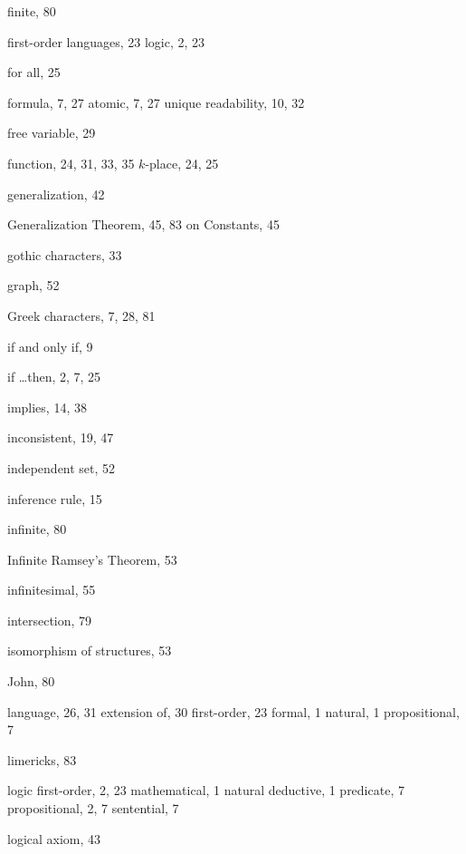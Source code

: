 \documentclass[12pt]{amsbook}
\theoremstyle{plain}
\theoremstyle{definition}
\theoremstyle{remark}
\begin{document}
\begin{theindex}
  \indexspace

  \item finite, 80
  \item first-order 
    \subitem languages, 23
    \subitem logic, 2, 23
  \item for all, 25
  \item formula, 7, 27
    \subitem atomic, 7, 27
    \subitem unique readability, 10, 32
  \item free variable, 29
  \item function, 24, 31, 33, 35
    \subitem $k$-place, 24, 25

  \indexspace

  \item generalization, 42
  \item Generalization Theorem, 45, 83
    \subitem on Constants, 45
  \item gothic characters, 33
  \item graph, 52
  \item Greek characters, 7, 28, 81

  \indexspace

  \item if and only if, 9
  \item if \dots then, 2, 7, 25
  \item implies, 14, 38
  \item inconsistent, 19, 47
  \item independent set, 52
  \item inference rule, 15
  \item infinite, 80
  \item Infinite Ramsey's Theorem, 53
  \item infinitesimal, 55
  \item intersection, 79
  \item isomorphism of structures, 53

  \indexspace

  \item John, 80

  \indexspace

  \item language, 26, 31
    \subitem extension of, 30
    \subitem first-order, 23
    \subitem formal, 1
    \subitem natural, 1
    \subitem propositional, 7
  \item limericks, 83
  \item logic 
    \subitem first-order, 2, 23
    \subitem mathematical, 1
    \subitem natural deductive, 1
    \subitem predicate, 7
    \subitem propositional, 2, 7
    \subitem sentential, 7
  \item logical axiom, 43


\end{theindex}
\end{document}
